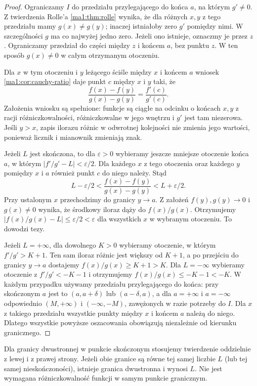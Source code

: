 \begin{proof}
Ograniczamy $I$ do przedziału przylegającego do końca $a$, na którym $g'\ne0$. Z twierdzenia Rolle'a \ref{ma1:thm:rolle} wynika, że dla różnych $x,y$ z tego przedziału mamy $g(x)\ne g(y)$; inaczej istniałoby zero $g'$ pomiędzy nimi. W szczególności $g$ ma co najwyżej jedno zero. Jeżeli ono istnieje, oznaczmy je przez $z$. Ograniczamy przedział do części między $z$ i końcem $a$, bez punktu $z$. W ten sposób $g(x)\ne0$ w całym otrzymanym otoczeniu.

Dla $x$ w tym otoczeniu i $y$ leżącego ściśle między $x$ i końcem $a$ wniosek \ref{ma1:cor:cauchy-ratio} daje punkt $c$ między $x$ i $y$ taki, że
\[
 \frac{f(x)-f(y)}{g(x)-g(y)}=\frac{f'(c)}{g'(c)}.
\]
Założenia wniosku są spełnione: funkcje są ciągłe na odcinku o końcach $x,y$ z racji różniczkowalności, różniczkowalne w jego wnętrzu i $g'$ jest tam niezerowa. Jeśli $y>x$, zapis ilorazu różnic w odwrotnej kolejności nie zmienia jego wartości, ponieważ licznik i mianownik zmieniają znak.

Jeżeli $L$ jest skończona, to dla $\varepsilon>0$ wybieramy jeszcze mniejsze otoczenie końca $a$, w którym $|f'/g'-L|<\varepsilon/2$. Dla każdego $x$ z tego otoczenia oraz każdego $y$ pomiędzy $x$ i $a$ również punkt $c$ do niego należy. Stąd
\[
 L-\varepsilon/2<
 \frac{f(x)-f(y)}{g(x)-g(y)}
 <L+\varepsilon/2.
\]
Przy ustalonym $x$ przechodzimy do granicy $y\to a$. Z założeń $f(y),g(y)\to0$ i $g(x)\ne0$ wynika, że środkowy iloraz dąży do $f(x)/g(x)$. Otrzymujemy $|f(x)/g(x)-L|\le\varepsilon/2<\varepsilon$ dla wszystkich $x$ w wybranym otoczeniu. To dowodzi tezy.

Jeżeli $L=+\infty$, dla dowolnego $K>0$ wybieramy otoczenie, w którym $f'/g'>K+1$. Ten sam iloraz różnic jest większy od $K+1$, a po przejściu do granicy $y\to a$ dostajemy $f(x)/g(x)\ge K+1>K$. Dla $L=-\infty$ wybieramy otoczenie z $f'/g'<-K-1$ i otrzymujemy $f(x)/g(x)\le-K-1<-K$. W każdym przypadku używamy przedziału przylegającego do końca: przy skończonym $a$ jest to $(a,a+\delta)$ lub $(a-\delta,a)$, a dla $a=+\infty$ i $a=-\infty$ odpowiednio $(M,+\infty)$ i $(-\infty,-M)$, zawężonych w razie potrzeby do $I$. Dla $x$ z takiego przedziału wszystkie punkty między $x$ i końcem $a$ należą do niego. Dlatego wszystkie powyższe oszacowania obowiązują niezależnie od kierunku granicznego.
\end{proof}
Dla granicy dwustronnej w punkcie skończonym stosujemy twierdzenie oddzielnie z lewej i z prawej strony. Jeżeli obie granice są równe tej samej liczbie $L$ (lub tej samej nieskończoności), istnieje granica dwustronna i wynosi $L$. Nie jest wymagana różniczkowalność funkcji w samym punkcie granicznym.

